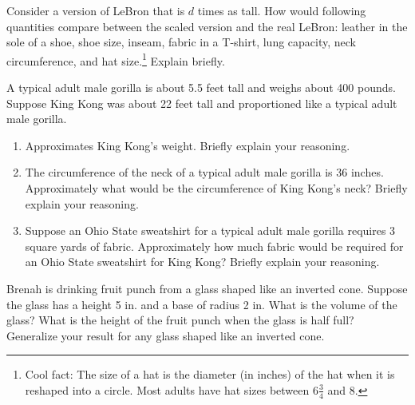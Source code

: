 \begin{prob}
Consider a version of LeBron that is $d$ times as tall.  How would following quantities compare between the scaled version and the real LeBron:   leather in the sole of a shoe, shoe size, inseam, fabric in a T-shirt, lung capacity, neck circumference, and hat size.\footnote{Cool fact:  The size of a hat is the diameter (in inches) of the hat when it is reshaped into a circle.  Most adults have hat sizes between $6\frac{3}{4}$ and $8$.}  Explain briefly.  
\end{prob}


\begin{prob}
A typical adult male gorilla is about 5.5 feet tall and weighs about 400 pounds. Suppose King Kong was about 22 feet tall and proportioned like a typical adult male gorilla.
\begin{enumerate}
\item Approximates King Kong's weight. Briefly explain your reasoning.
\item The circumference of the neck of a typical adult male gorilla is 36 inches. Approximately what would be the circumference of King Kong's neck? Briefly explain your reasoning.
\item Suppose an Ohio State sweatshirt for a typical adult male gorilla requires 3 square yards of fabric.  Approximately how much fabric would be required for an Ohio State sweatshirt for King Kong?  Briefly explain your reasoning.
\end{enumerate}
\end{prob}

\begin{prob}
Brenah is drinking fruit punch from a glass shaped like an inverted cone.  Suppose the glass has a height 5 in. and a base of radius 2 in.  What is the volume of the glass?  What is the height of the fruit punch when the glass is half full?  Generalize your result for any glass shaped like an inverted cone.  
\end{prob}

